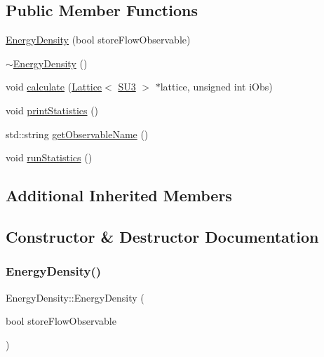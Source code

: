 \subsection*{Public Member Functions}
\begin{DoxyCompactItemize}
\item 
\mbox{\hyperlink{class_energy_density_a1d23cfe5690c9daf8b2f0ec8f6471c5f}{Energy\+Density}} (bool store\+Flow\+Observable)
\item 
\mbox{\hyperlink{class_energy_density_a307e031858ac7149f5689911f8ff22fb}{$\sim$\+Energy\+Density}} ()
\item 
void \mbox{\hyperlink{class_energy_density_ae8e5e29257104d881bcabeadc3b2c9e7}{calculate}} (\mbox{\hyperlink{class_lattice}{Lattice}}$<$ \mbox{\hyperlink{class_s_u3}{S\+U3}} $>$ $\ast$lattice, unsigned int i\+Obs)
\item 
void \mbox{\hyperlink{class_energy_density_ad108e32bc670f17f15b4ed433d8bbec7}{print\+Statistics}} ()
\item 
std\+::string \mbox{\hyperlink{class_energy_density_a59b320595bca439333d36e3753ca07f0}{get\+Observable\+Name}} ()
\item 
void \mbox{\hyperlink{class_energy_density_a584e164453ce880a45478c9b48ce2c4b}{run\+Statistics}} ()
\end{DoxyCompactItemize}
\subsection*{Additional Inherited Members}


\subsection{Constructor \& Destructor Documentation}
\mbox{\label{class_energy_density_a1d23cfe5690c9daf8b2f0ec8f6471c5f}} 
\subsubsection{\texorpdfstring{EnergyDensity()}{EnergyDensity()}}
{\footnotesize\ttfamily Energy\+Density\+::\+Energy\+Density (\begin{DoxyParamCaption}\item[{bool}]{store\+Flow\+Observable }\end{DoxyParamCaption})}

